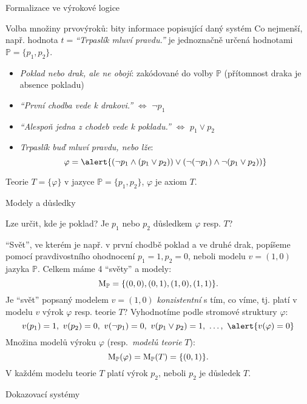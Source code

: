 \documentclass{beamer}
\begin{document}
\begin{frame}{Formalizace ve výrokové logice}

    Volba množiny prvovýroků: bity informace popisující daný systém
    Co nejmenší, např. hodnota $t=${\it ``Trpaslík mluví pravdu.''} je jednoznačně určená hodnotami $\mathbb P=\{p_1,p_2\}$.
    \begin{itemize}
        \item {\it Poklad nebo drak, ale ne obojí}: zakódované do volby $\mathbb P$ (přítomnost draka je absence pokladu)
        \item {\it ``První chodba vede k drakovi.''} $\Leftrightarrow$ \alert{$\neg p_1$}
        \item {\it ``Alespoň jedna z chodeb vede k pokladu.''} $\Leftrightarrow$ \alert{$p_1 \lor p_2$}
        \item {\it Trpaslík buď mluví pravdu, nebo lže}:
        $$
        \varphi = \alert{(\neg p_1 \land (p_1 \lor p_2)) \lor (\neg (\neg p_1) \land \neg (p_1 \lor p_2))}
        $$
    \end{itemize}

    \alert{Teorie} $T=\{ \varphi \}$ v \alert{jazyce} $\mathbb P=\{p_1,p_2\}$, $\varphi$ je \alert{axiom} $T$.

\end{frame}


\begin{frame}{Modely a důsledky}

    Lze určit, kde je poklad? Je $p_1$ nebo $p_2$ \alert{důsledkem} $\varphi$ resp. $T$?    

    \alert{``Svět''}, ve kterém je např. v první chodbě poklad a ve druhé drak, popíšeme pomocí \alert{pravdivostního ohodnocení} $p_1=1,p_2=0$, neboli \alert{modelu} $v=(1,0)$ jazyka $\mathbb P$. Celkem máme 4 ``světy'' a modely:
    $$
    \operatorname{M}_\mathbb P=\{(0,0),(0,1),(1,0),(1,1)\}.
    $$
    Je ``svět'' popsaný modelem $v = (1,0)$ \emph{konzistentní} s tím, co víme, tj. \alert{platí} v modelu $v$ výrok $\varphi$ resp. teorie $T$? Vyhodnotíme podle stromové struktury $\varphi$:
    $$
    v(p_1) = 1,\ v(p_2) = 0,\ v(\neg p_1) = 0,\ v(p_1 \lor p_2)=1,\ \dots,\ \alert{v(\varphi)=0}
    $$
    Množina \alert{modelů výroku} \( \varphi \) (resp.\ \emph{modelů teorie} \( T \)):
    $$
    \operatorname{M}_\mathbb P(\varphi)=\operatorname{M}_\mathbb P(T)=\{(0,1)\}.
    $$
    \alert{V každém modelu teorie $T$ platí výrok $p_2$}, neboli $p_2$ je \alert{důsledek} $T$.
    

\end{frame}


\begin{frame}{Dokazovací systémy}
    
\end{frame}
\end{document}
